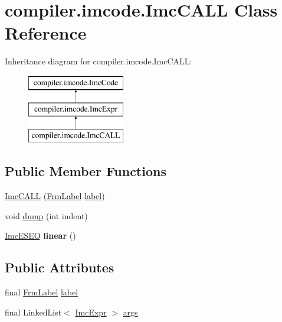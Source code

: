 \hypertarget{classcompiler_1_1imcode_1_1_imc_c_a_l_l}{}\section{compiler.\+imcode.\+Imc\+C\+A\+LL Class Reference}
\label{classcompiler_1_1imcode_1_1_imc_c_a_l_l}
Inheritance diagram for compiler.\+imcode.\+Imc\+C\+A\+LL\+:\begin{figure}[H]
\begin{center}
\leavevmode
\includegraphics[height=3.000000cm]{classcompiler_1_1imcode_1_1_imc_c_a_l_l}
\end{center}
\end{figure}
\subsection*{Public Member Functions}
\begin{DoxyCompactItemize}
\item 
\hyperlink{classcompiler_1_1imcode_1_1_imc_c_a_l_l_acd8aba4e577fd131e2769921272ce540}{Imc\+C\+A\+LL} (\hyperlink{classcompiler_1_1frames_1_1_frm_label}{Frm\+Label} \hyperlink{classcompiler_1_1imcode_1_1_imc_c_a_l_l_aa763ad3e64c6ef18e846d2fcb87959ef}{label})
\item 
void \hyperlink{classcompiler_1_1imcode_1_1_imc_c_a_l_l_a9cbde704450bc77440e999be90f11de1}{dump} (int indent)
\item 
\mbox{\label{classcompiler_1_1imcode_1_1_imc_c_a_l_l_a3a9ac56800c061a7047cd58f3362b96c}} 
\hyperlink{classcompiler_1_1imcode_1_1_imc_e_s_e_q}{Imc\+E\+S\+EQ} {\bfseries linear} ()
\end{DoxyCompactItemize}
\subsection*{Public Attributes}
\begin{DoxyCompactItemize}
\item 
final \hyperlink{classcompiler_1_1frames_1_1_frm_label}{Frm\+Label} \hyperlink{classcompiler_1_1imcode_1_1_imc_c_a_l_l_aa763ad3e64c6ef18e846d2fcb87959ef}{label}
\item 
final Linked\+List$<$ \hyperlink{classcompiler_1_1imcode_1_1_imc_expr}{Imc\+Expr} $>$ \hyperlink{classcompiler_1_1imcode_1_1_imc_c_a_l_l_a3c7bcbe1544af8a07454f3ce580856c0}{args}
\end{DoxyCompactItemize}


